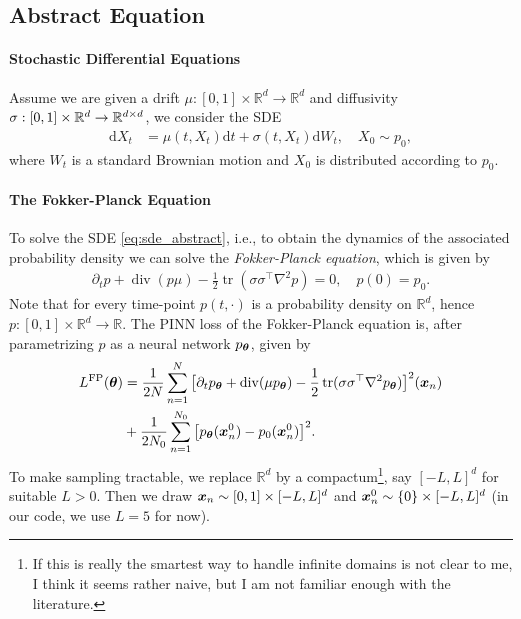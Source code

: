 \subsection{Abstract Equation}
\paragraph{Stochastic Differential Equations}
Assume we are given a drift $\mu:[0,1]\times \mathbb R^d\to\mathbb R^d$ and diffusivity $\sigma:[0,1] \times {\mathbb{R}}^d \to \mathbb R^{d\times d}$, we consider the SDE
\begin{align}\label{eq:sde_abstract}
    \mathrm dX_t
    &=
    \mu(t, X_t)\mathrm d t
    +
    \sigma(t, X_t) \mathrm d W_t,
    \quad 
    X_0 \sim p_0,
\end{align}
where $W_t$ is a standard Brownian motion and $X_0$ is distributed according to $p_0$. 

\paragraph{The Fokker-Planck Equation}
To solve the SDE \eqref{eq:sde_abstract}, i.e., to obtain the dynamics of the associated probability density we can solve the \emph{Fokker-Planck equation}, which is given by
\begin{align}\label{eq:fokker_planck_abstract}
    \partial_t p
    +
    \operatorname{div}(p\mu)
    -
    \frac12 \operatorname{tr}(\sigma \sigma^\top\nabla^2 p)
    =
    0,
    \quad
    p(0) = p_0.
\end{align}
Note that for every time-point $p(t,\cdot)$ is a probability density on $\mathbb R^d$, hence $p:[0,1]\times\mathbb R^d \to \mathbb R$. The PINN loss of the Fokker-Planck equation is, after parametrizing $p$ as a neural network $p_{{\bm{\theta}}}$, given by
\begin{align*}
    L^{\textrm{FP}}({\bm{\theta}})
    &=
    \frac{1}{2N}
    \sum_{n=1}^{N}
    \big[
    \partial_t p_{{\bm{\theta}}}
    +
    \operatorname{div}(\mu p_{{\bm{\theta}}})
    -
    \frac12 \operatorname{tr}(\sigma\sigma^\top\nabla^2 p_{{\bm{\theta}}})
    \big]^2
    ({\bm{x}}_n)
    \\
    &+
    \frac{1}{2 N_0}
    \sum_{n=1}^{N_0}
    \big[
    p_{{\bm{\theta}}}({\bm{x}}_n^0) - p_0({\bm{x}}_n^0)
    \big]^2.
\end{align*}
To make sampling tractable, we replace $\mathbb R^d$ by a compactum\footnote{If this is really the smartest way to handle infinite domains is not clear to me, I think it seems rather naive, but I am not familiar enough with the literature.}, say $[-L, L]^d$ for suitable $L>0$. Then we draw ${\bm{x}}_n \sim [0, 1] \times [-L, L]^d$ and ${\bm{x}}_n^0 \sim \{0\} \times [-L, L]^d$ (in our code, we use $L=5$ for now).

